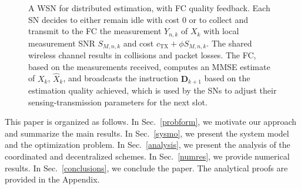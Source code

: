 \documentclass[10pt,twocolumn,twoside]{IEEEtran}
\theoremstyle{plain}
\begin{document}
\begin{figure}
{}
\vspace{-3mm}
\caption{A WSN for distributed estimation, with FC quality feedback.
Each SN decides to either remain idle with cost $0$ or to collect and transmit to the FC the measurement $Y_{n,k}$ of $X_k$ with local measurement SNR $S_{M,n,k}$ and cost $c_{\mathrm{TX}}+\phi S_{M,n,k}$. The shared wireless channel results in collisions and packet losses. The FC, 
based on the measurements received, computes an MMSE estimate of $X_k$, $\hat X_k$, and broadcasts the instruction $\mathbf D_{k+1}$ based on the estimation quality 
achieved,
which is used by the SNs to adjust their sensing-transmission parameters for the next slot.}\label{fig:WSN}
\vspace{-5mm}
\end{figure}

 This paper is organized as follows.
  In Sec.~\ref{probform}, we motivate our approach and summarize the main results.
  In Sec.~\ref{sysmo}, we present the system model and the optimization problem.
 In Sec.~\ref{analysis}, we present
 the analysis of the coordinated and decentralized schemes.
In Sec.~\ref{numres}, we provide numerical results.
In Sec.~\ref{conclusions}, we conclude the paper.
The analytical proofs are provided in the Appendix.
\vspace{-0.3cm}
\end{document}
